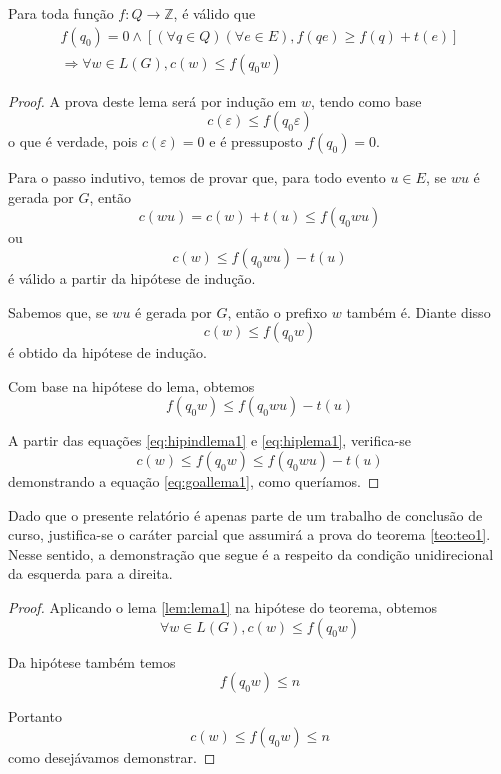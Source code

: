 \begin{lem}
	\label{lem:lema1}
	Para toda função $f : Q \to \mathbb{Z}$, é válido que\begin{equation*}
	\begin{aligned}
	f(q_0) = 0 \wedge [(\forall q \in Q)(\forall e \in E), f(qe) \geq f(q) + t(e)]\\\Rightarrow \forall w \in L(G), c(w) \leq f(q_0w)
	\end{aligned}
	\end{equation*}
\end{lem}
\begin{proof}
A prova deste lema será por indução em $w$, tendo como base $$c(\varepsilon) \leq f(q_0\varepsilon)$$ o que é verdade, pois $c(\varepsilon) = 0$ e é pressuposto $f(q_0) = 0$.

Para o passo indutivo, temos de provar que, para todo evento $u \in E$, se $ wu$ é gerada por $G$, então $$c(wu) = c(w) + t(u) \leq f(q_0wu)$$ ou \begin{equation}
\label{eq:goallema1}
c(w) \leq f(q_0wu) - t(u)
\end{equation} é válido a partir da hipótese de indução.

Sabemos que, se $wu$ é gerada por $G$, então o prefixo $w$ também é. Diante disso \begin{equation}
\label{eq:hipindlema1}
c(w) \leq f(q_0w)
\end{equation} é obtido da hipótese de indução.

Com base na hipótese do lema, obtemos \begin{equation}
\label{eq:hiplema1}
f(q_0w) \leq f(q_0wu) - t(u)
\end{equation}

A partir das equações \ref{eq:hipindlema1} e \ref{eq:hiplema1}, verifica-se $$c(w) \leq f(q_0w) \leq f(q_0wu) - t(u)$$ demonstrando a equação \ref{eq:goallema1}, como queríamos.
\end{proof}

Dado que o presente relatório é apenas parte de um trabalho de conclusão de curso, justifica-se o caráter parcial que assumirá a prova do teorema \ref{teo:teo1}. Nesse sentido, a demonstração que segue é a respeito da condição unidirecional da esquerda para a direita.

\begin{proof}
Aplicando o lema \ref{lem:lema1} na hipótese do teorema, obtemos $$\forall w \in L(G), c(w) \leq f(q_0w)$$

Da hipótese também temos $$f(q_0w) \leq n$$

Portanto $$c(w) \leq f(q_0w) \leq n$$ como desejávamos demonstrar.
\end{proof}


